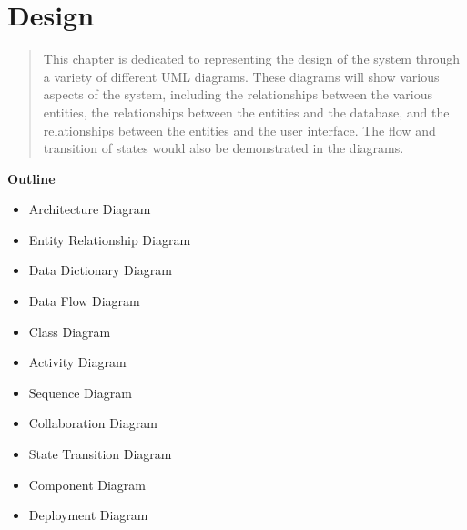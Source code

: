 
\section{Design}

\vspace{20mm}



\begin{abstract}

    This chapter is dedicated to representing the design of the system through a variety of different UML diagrams. These diagrams will show various aspects of the system, including the relationships between the various entities, the relationships between the entities and the database, and the relationships between the entities and the user interface. The flow and transition of states would also be demonstrated in the diagrams.


\end{abstract}

\vspace{20mm}

\large{\textbf{Outline}}

\begin{center}
    \begin{itemize}
        \item Architecture Diagram
        \item Entity Relationship Diagram
        \item Data Dictionary Diagram
        \item Data Flow Diagram
        \item Class Diagram
        \item Activity Diagram
        \item Sequence Diagram
        \item Collaboration Diagram
        \item State Transition Diagram
        \item Component Diagram
        \item Deployment Diagram
    \end{itemize}
\end{center}
\pagebreak


